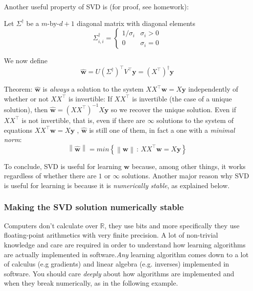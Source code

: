 \documentclass[11pt]{article}
\newcommand{\norm}[1]{\left\| #1\right\|}
\newcommand{\R}{\ensuremath{\mathbb{R}}}
\newcommand{\Tr}{\ensuremath{\top}}
\begin{document}
\vspace{5mm}

Another useful property of SVD is (for proof, see homework):

Let $\Sigma^\dagger$ be a  $m$-by-$d+1$  diagonal matrix with diagonal elements
  \[
   \Sigma^\dagger_{i,i} =
   \begin{cases}
 1/\sigma_i & \sigma_i>0\\
 0 & \sigma_i=0
   \end{cases}
  \]

 We now define
    \[
  \hat{\mathbf{w}}=U (\Sigma^\dagger)^\Tr V^\Tr \mathbf{y} =(X^{\Tr})^{\dagger}\mathbf{y}
    \]


Theorem: $\hat{\mathbf{w}}$ is \emph{always} a solution to the system  $XX^\Tr \mathbf{w}=X\mathbf{y}$ independently of whether or not $X X^\Tr$ is invertible:
If $X X^\Tr$ is invertible (the case of a unique solution), then  $\hat{\mathbf{w}} = (XX^\Tr)^{-1}X\mathbf{y}$ so we recover the unique solution.
Even if $X X^\Tr$ is not invertible, that is, even if there are $\infty$  solutions to the system of equations  $XX^\Tr \mathbf{w}=X\mathbf{y}$ , $\hat{\mathbf{w}}$ is still one of them, in fact a one with a \emph{minimal norm}:
  $$\norm{\hat{\mathbf{w}}}=min\left\{ \norm{\mathbf{w}}\,:\,XX^\Tr \mathbf{w}=X\mathbf{y} \right\}$$


\vspace{4mm}
To conclude, SVD is useful for learning $\mathbf{w}$ because, among other things, it  works regardless of whether there are $1$ or $\infty$ solutions.
Another major reason why SVD is useful for learning is because it is \emph{numerically stable}, as explained below.

\subsubsection{Making the SVD solution numerically stable}

Computers don't calculate over $\R$, they use bits and more specifically they use floating-point arithmetics with very finite precision. A lot of non-trivial knowledge and care are required in order to understand how learning algorithms are actually implemented in software.\textit{Any} learning algorithm comes down to a lot of calculus (e.g gradients) and linear algebra (e.g. inverses) implemented in software. You should care \textit{deeply} about how algorithms are implemented and when they break numerically, as in the following example.
\vspace{5mm}
\end{document}
